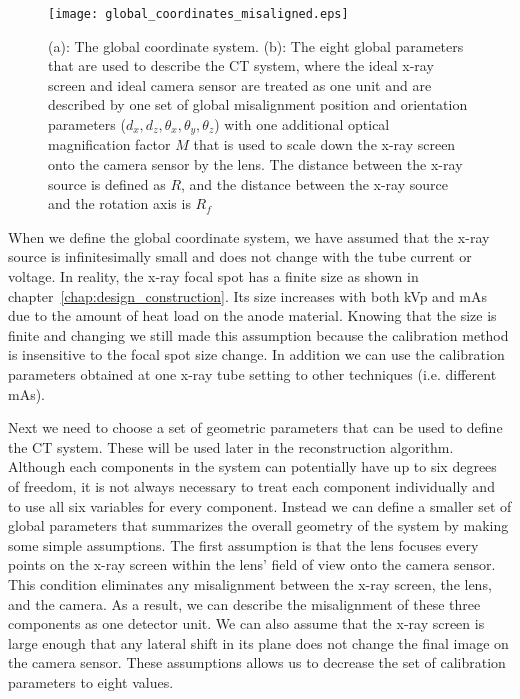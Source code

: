 \begin{figure}[ht]
\centering
\texttt{[image: global\_coordinates\_misaligned.eps]}
\caption{ (a): The global coordinate system.  (b): The eight global parameters that are used to describe the CT system, where the ideal x-ray screen and ideal camera sensor are treated as one unit and are described by one set of global misalignment position and orientation parameters ($d_x, d_z, \theta_x, \theta_y, \theta_z$) with one additional optical magnification factor $M$ that is used to scale down the x-ray screen onto the camera sensor by the lens.  The distance between the x-ray source is defined as $R$, and the distance between the x-ray source and the rotation axis is $R_f$}
\label{fig:global_coord_misaligned}
\end{figure}

When we define the global coordinate system, we have assumed that the x-ray source is infinitesimally small and does not change with the tube current or voltage.  In reality, the x-ray focal spot has a finite size as shown in chapter~\ref{chap:design_construction}.  Its size increases with both kVp and mAs due to the amount of heat load on the anode material.  Knowing that the size is finite and changing we still made this assumption because the calibration method is insensitive to the focal spot size change.  In addition we can use the calibration parameters obtained at one x-ray tube setting to other techniques (i.e. different mAs). 

Next we need to choose a set of geometric parameters that can be used to define the CT system.  These will be used later in the reconstruction algorithm.  Although each components in the system can potentially have up to six degrees of freedom, it is not always necessary to treat each component individually and to use all six variables for every component.  Instead we can define a smaller set of global parameters that summarizes the overall geometry of the system by making some simple assumptions.  The first assumption is that the lens focuses every points on the x-ray screen within the lens' field of view onto the camera sensor.  This condition eliminates any misalignment between the x-ray screen, the lens, and the camera.  As a result, we can describe the misalignment of these three components as one detector unit.  We can also assume that the x-ray screen is large enough that any lateral shift in its plane does not change the final image on the camera sensor.  These assumptions allows us to decrease the set of calibration parameters to eight values.

